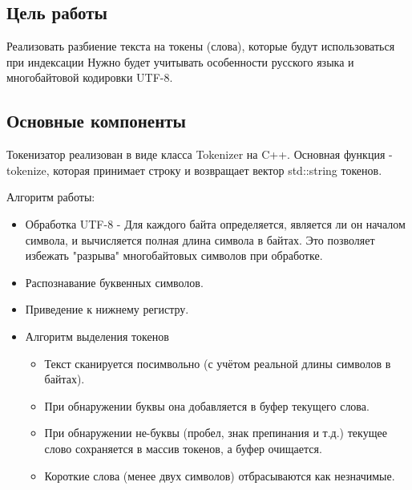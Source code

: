 \documentclass[a4paper,12pt]{article}
\begin{document}
\subsection{Цель работы}
Реализовать разбиение текста на токены (слова), которые будут использоваться при индексации Нужно будет учитывать особенности русского языка и многобайтовой кодировки UTF-8.

\subsection{Основные компоненты}
Токенизатор реализован в виде класса Tokenizer на C++. Основная функция - tokenize, которая принимает строку и возвращает вектор std::string токенов.

Алгоритм работы:
\begin{itemize}
    \item Обработка UTF-8 - Для каждого байта определяется, является ли он началом символа, и вычисляется полная длина символа в байтах. Это позволяет избежать "разрыва" многобайтовых символов при обработке.
    \item Распознавание буквенных символов.
    \item Приведение к нижнему регистру.
    \item Алгоритм выделения токенов
    \begin{itemize}
        \item Текст сканируется посимвольно (с учётом реальной длины символов в байтах).
        \item При обнаружении буквы она добавляется в буфер текущего слова.
        \item При обнаружении не-буквы (пробел, знак препинания и т.д.) текущее слово сохраняется в массив токенов, а буфер очищается.
        \item Короткие слова (менее двух символов) отбрасываются как незначимые.
    \end{itemize}
\end{itemize}
\end{document}
